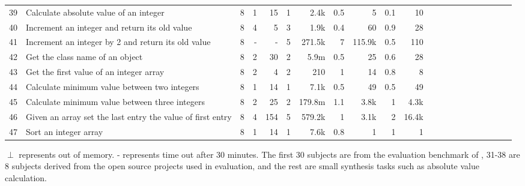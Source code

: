 \begin{table*}[!htb]
\begin{center}
\begin{tabular}{@{}c|l|r|rr|rr|rr|rrrrrrrrrrrr@{}}
39&Calculate absolute value of an integer&8&1&15&1&2.4k&0.5&5&0.1&10\\
40&Increment an integer and return its old value&8&4&5&3&1.9k&0.4&60&0.9&28\\
41&Increment an integer by 2 and return its old value&8&-&-&5&271.5k&7&115.9k&0.5&110\\
42&Get the class name of an object&8&2&30&2&5.9m&0.5&25&0.6&28\\
43&Get the first value of an integer array&8&2&4&2&210&1&14&0.8&8\\
44&Calculate minimum value between two integers&8&1&14&1&7.1k&0.5&49&0.5&49\\
45&Calculate minimum value between three integers&8&2&25&2&179.8m&1.1&3.8k&1&4.3k\\
46&Given an array set the last entry the value of first entry&8&4&154&5&579.2k&1&3.1k&2&16.4k\\
47&Sort an integer array&8&1&14&1&7.6k&0.8&1&1&1\\


  \end{tabular}
  
  \vspace{1mm}
 $\perp$ represents out of memory. - represents time out after 30 minutes. The first 30 subjects are from the evaluation benchmark of \spt, 31-38 are 8 subjects derived from the open source projects used in \spt evaluation, and the rest are small synthesis tasks such as absolute value calculation.
\end{center}
\end{table*}